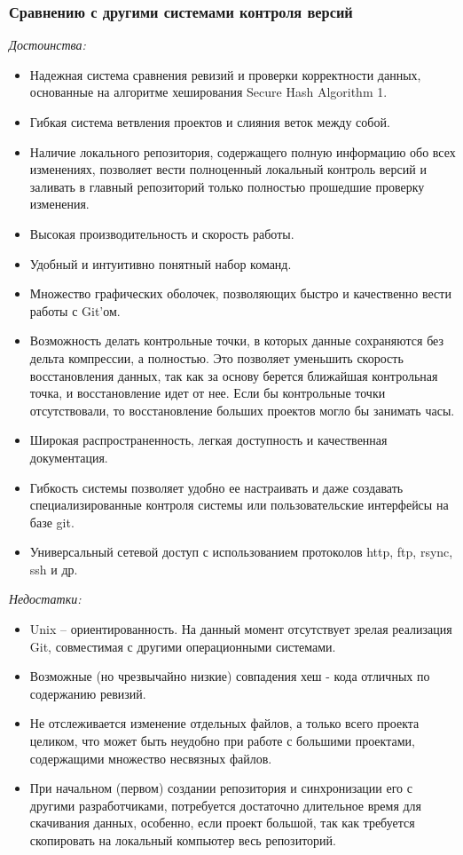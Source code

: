 \documentclass{article}
\begin{document}
		\subsubsection{Сравнению с другими системами контроля версий}
		 	\textit{Достоинства:}
				\begin{itemize}
\item Надежная система сравнения ревизий и проверки корректности данных, основанные на алгоритме хеширования Secure Hash Algorithm 1.
\item Гибкая система ветвления проектов и слияния веток между собой.
\item Наличие локального репозитория, содержащего полную информацию обо всех изменениях, позволяет вести полноценный локальный контроль версий и заливать в главный репозиторий только полностью прошедшие проверку изменения.
\item Высокая производительность и скорость работы.
\item Удобный и интуитивно понятный набор команд.
\item Множество графических оболочек, позволяющих быстро и качественно вести работы с Git’ом.
\item Возможность делать контрольные точки, в которых данные сохраняются без дельта компрессии, а полностью. Это позволяет уменьшить скорость восстановления данных, так как за основу берется ближайшая контрольная точка, и восстановление идет от нее. Если бы контрольные точки отсутствовали, то восстановление больших проектов могло бы занимать часы.
\item Широкая распространенность, легкая доступность и качественная документация.
\item Гибкость системы позволяет удобно ее настраивать и даже создавать специализированные контроля системы или пользовательские интерфейсы на базе git.
\item Универсальный сетевой доступ с использованием протоколов http, ftp, rsync, ssh и др.\\
				\end{itemize}
			\textit{Недостатки:}
				\begin{itemize}
\item Unix – ориентированность. На данный момент отсутствует зрелая реализация Git, совместимая с другими операционными системами.
\item Возможные (но чрезвычайно низкие) совпадения хеш - кода отличных по содержанию ревизий.
\item Не отслеживается изменение отдельных файлов, а только всего проекта целиком, что может быть неудобно при работе с большими проектами, содержащими множество несвязных файлов.
\item При начальном (первом) создании репозитория и синхронизации его с другими разработчиками, потребуется достаточно длительное время для скачивания данных, особенно, если проект большой, так как требуется скопировать на локальный компьютер весь репозиторий. 
				\end{itemize}
\end{document}
